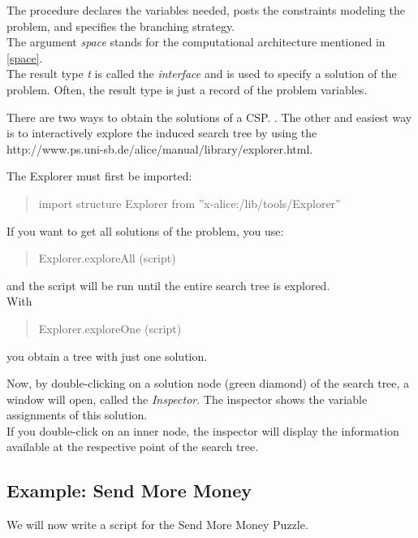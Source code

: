 \documentclass[a4paper]{scrartcl}
\begin{document}
\par
The procedure declares the variables needed, 
posts the constraints modeling the problem, 
and specifies the branching strategy.\\
The argument {\it space} stands for the 
computational architecture mentioned in 
\ref{space}.\\
The result type {\it t} is called 
the {\it interface} and is used to specify
a solution of the problem.
Often, the result type is just a record of the 
problem variables.\\
\par
There are two ways to obtain the solutions of a 
CSP. . 
The other
and easiest way is to interactively explore the 
induced search tree by using the
\htmladdnormallink{\textcolor{blue}{Explorer}}
{http://www.ps.uni-sb.de/alice/manual/library/explorer.html}.

The Explorer  must first be imported:\\
\begin{quote}
import structure Explorer from ''x-alice:/lib/tools/Explorer''\\
\end{quote}
If you want to get all solutions of the problem, 
you use:\\
\begin{quote}
Explorer.exploreAll (script)\\
\end{quote}
and the script will be run until the entire 
search tree is explored.\\
With 
\begin{quote}
Explorer.exploreOne (script)\\
\end{quote}
you obtain a tree with just one solution.\\
\par
Now, by double-clicking on a solution node 
(green diamond) of the search tree, a window
will open, called the {\it Inspector}. The 
inspector shows the variable assignments of
this solution.\\
If you double-click on an inner node, the 
inspector will display the information available 
at the respective point of the search tree.

\subsection{Example: Send More Money}
We will now write a script for the Send More 
Money Puzzle.
\end{document}

